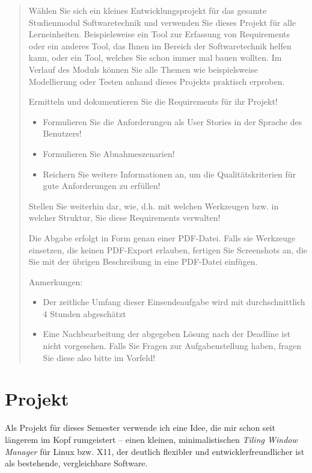 \documentclass{article}
\begin{document}
\begin{quote}
	Wählen Sie sich ein kleines Entwicklungsprojekt für das gesamte Studienmodul Softwaretechnik und
	verwenden Sie dieses Projekt für alle Lerneinheiten. Beispielsweise ein Tool zur Erfassung von
	Requirements oder ein anderes Tool, das Ihnen im Bereich der Softwaretechnik helfen kann, oder
	ein Tool, welches Sie schon immer mal bauen wollten. Im Verlauf des Moduls können Sie alle Themen
	wie beispielsweise Modellierung oder Testen anhand dieses Projekts praktisch erproben.

	Ermitteln und dokumentieren Sie die Requirements für ihr Projekt!

	\begin{itemize}
		\item Formulieren Sie die Anforderungen als User Stories in der Sprache des Benutzers!
		\item Formulieren Sie Abnahmeszenarien!
		\item Reichern Sie weitere Informationen an, um die Qualitätskriterien für gute Anforderungen zu erfüllen!
	\end{itemize}

	Stellen Sie weiterhin dar, wie, d.h. mit welchen Werkzeugen bzw. in welcher Struktur, Sie diese Requirements verwalten!

	Die Abgabe erfolgt in Form genau einer PDF-Datei. Falls sie Werkzeuge einsetzen, die keinen PDF-Export erlauben, fertigen Sie Screenshots an, die Sie mit der übrigen Beschreibung in eine PDF-Datei einfügen.

	Anmerkungen:
	\begin{itemize}
		\item Der zeitliche Umfang dieser Einsendeaufgabe wird mit durchschnittlich 4 Stunden abgeschätzt
		\item Eine Nachbearbeitung der abgegeben Lösung nach der Deadline ist nicht vorgesehen. Falls Sie Fragen zur Aufgabenstellung haben, fragen Sie diese also bitte im Vorfeld!
	\end{itemize}
\end{quote}

\section{Projekt}

Als Projekt für dieses Semester verwende ich eine Idee, die mir schon seit längerem im Kopf rumgeistert
– einen kleinen, minimalistischen \emph{Tiling Window Manager} für Linux bzw. X11, der deutlich flexibler
und entwicklerfreundlicher ist als bestehende, vergleichbare Software.
\end{document}
